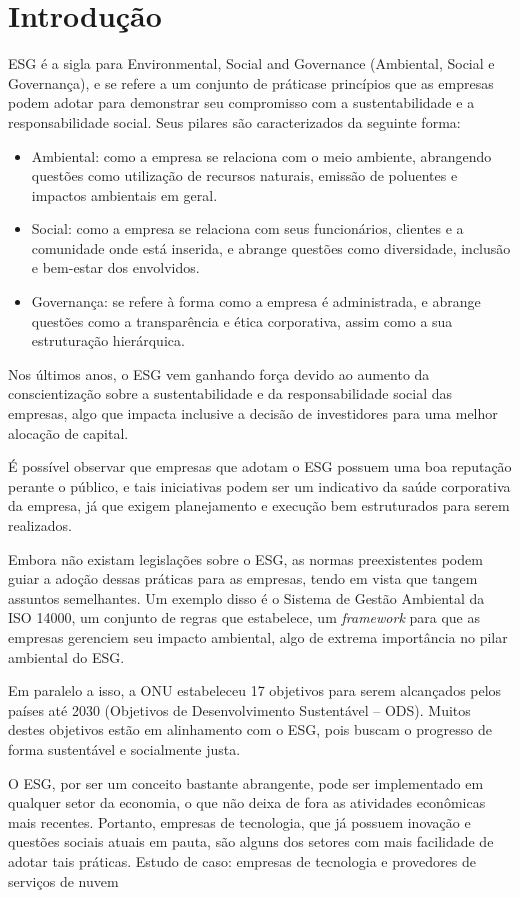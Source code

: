 \documentclass[12pt]{article}
\begin{document}
	\section*{Introdução}
	ESG é a sigla para Environmental, Social and Governance (Ambiental, Social e Governança), e se refere a um conjunto de práticase princípios que as empresas podem adotar para demonstrar seu compromisso com a sustentabilidade e a responsabilidade social. Seus pilares são caracterizados da seguinte forma:
	\begin{itemize}
		\item Ambiental: como a empresa se relaciona com o meio ambiente, abrangendo questões como utilização de recursos naturais, emissão de poluentes e impactos ambientais em geral.
		\item Social: como a empresa se relaciona com seus funcionários, clientes e a comunidade onde está inserida, e abrange questões como diversidade, inclusão e bem-estar dos envolvidos.
		\item Governança: se refere à forma como a empresa é administrada, e abrange questões como a transparência e ética corporativa, assim como a sua estruturação hierárquica.
	\end{itemize}
	Nos últimos anos, o ESG vem ganhando força devido ao aumento da conscientização sobre a sustentabilidade e da responsabilidade social das empresas, algo que impacta inclusive a decisão de investidores para uma melhor alocação de capital.
	
	É possível observar que empresas que adotam o ESG possuem uma boa reputação perante o público, e tais iniciativas podem ser um indicativo da saúde corporativa da empresa, já que exigem planejamento e execução bem estruturados para serem realizados.
	
	Embora não existam legislações sobre o ESG, as normas preexistentes podem guiar a adoção dessas práticas para as empresas, tendo em vista que tangem assuntos semelhantes. Um exemplo disso é o Sistema de Gestão Ambiental da ISO 14000, um conjunto de regras que estabelece, um \emph{framework} para que as empresas gerenciem seu impacto ambiental, algo de extrema importância no pilar ambiental do ESG.
	
	Em paralelo a isso, a ONU estabeleceu 17 objetivos para serem alcançados pelos países até 2030 (Objetivos de Desenvolvimento Sustentável – ODS). Muitos destes objetivos estão em alinhamento com o ESG, pois buscam o progresso de forma sustentável e socialmente justa.
	
	O ESG, por ser um conceito bastante abrangente, pode ser implementado em qualquer setor da economia, o que não deixa de fora as atividades econômicas mais recentes. Portanto, empresas de tecnologia, que já possuem inovação e questões sociais atuais em pauta, são alguns dos setores com mais facilidade de adotar tais práticas.
	Estudo de caso: empresas de tecnologia e provedores de serviços de nuvem
	
\end{document}

